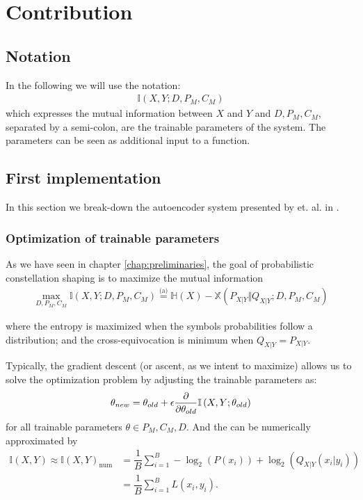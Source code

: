 \chapter{Contribution}\label{chap:contribution}
\section{Notation}
In the following we will use the notation:
\begin{align*}
	\mathbb{I} \left(X , Y; D, P_M, C_M \right)
\end{align*}
which expresses the mutual information between $X$ and $Y$ and $D, P_M, C_M$, separated by a semi-colon, are the trainable parameters of the system. The parameters can be seen as additional input to a function.
\section{First implementation}
In this section we break-down the autoencoder system presented by \citep{Aref} et. al. in \cite{Aref}.
\subsection{Optimization of trainable parameters}
As we have seen in chapter \ref{chap:preliminaries}, the goal of probabilistic constellation shaping is to maximize the mutual information
\begin{align}
	 \max_{D, P_M, C_M} \mathbb{I} \left(X , Y ; D, P_M, C_M \right) \overset{\text{(a)}}{=} \mathbb{H}(X) - \mathbb{X}(P_{X|Y} \Vert Q_{X|Y} ; D, P_M, C_M)
\end{align}

where the entropy is maximized when the symbols probabilities follow a  distribution; and the cross-equivocation is minimum when $Q_{X|Y} = P_{X|Y}$.

Typically, the gradient descent (or ascent, as we intent to maximize) allows us to solve the optimization problem by adjusting the trainable parameters as:
\begin{align}
	\theta_{new} = \theta_{old} + \epsilon \pdv{\theta_{old}} \mathbb{I} \left(X , Y ; \theta_{old} \right)
\end{align}
for all trainable parameters $\theta \in P_M, C_M, D$. And the  can be numerically approximated by
\begin{align}
	\mathbb{I} \left(X , Y\right) \approx \mathbb{I} \left(X , Y\right)_{\text{num}} &= \dfrac{1}{B} \sum \limits_{i = 1}^{B} - \log_2(P(x_i)) + \log_2(Q_{X|Y}(x_i|y_i))\\
	&= \dfrac{1}{B} \sum \limits_{i = 1}^{B} L(x_i, y_i).
\end{align}

